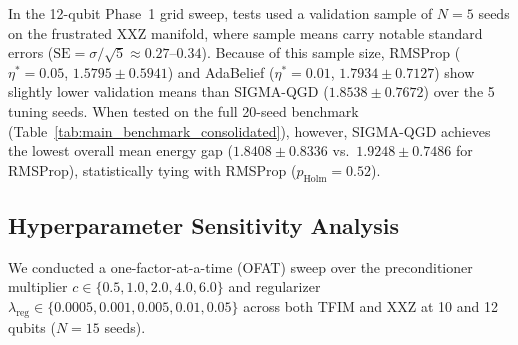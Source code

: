 \documentclass[11pt,a4paper]{article}
\begin{document}
In the 12-qubit Phase~1 grid sweep, tests used a validation sample of $N=5$ seeds on the frustrated XXZ manifold, where sample means carry notable standard errors ($\text{SE} = \sigma/\sqrt{5} \approx 0.27\text{--}0.34$). Because of this sample size, RMSProp ($\eta^*=0.05$, $1.5795 \pm 0.5941$) and AdaBelief ($\eta^*=0.01$, $1.7934 \pm 0.7127$) show slightly lower validation means than SIGMA-QGD ($1.8538 \pm 0.7672$) over the 5 tuning seeds. When tested on the full 20-seed benchmark (Table~\ref{tab:main_benchmark_consolidated}), however, SIGMA-QGD achieves the lowest overall mean energy gap ($1.8408 \pm 0.8336$ vs.\ $1.9248 \pm 0.7486$ for RMSProp), statistically tying with RMSProp ($p_{\text{Holm}} = 0.52$).

\subsection{Hyperparameter Sensitivity Analysis}
\label{sec:sensitivity_results}
We conducted a one-factor-at-a-time (OFAT) sweep over the preconditioner multiplier $c \in \{0.5, 1.0, 2.0, 4.0, 6.0\}$ and regularizer $\lambda_{\text{reg}} \in \{0.0005, 0.001, 0.005, 0.01, 0.05\}$ across both TFIM and XXZ at 10 and 12 qubits ($N=15$ seeds).
\end{document}
